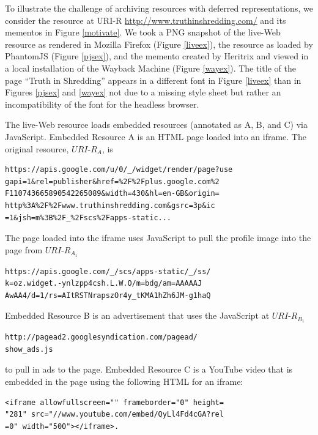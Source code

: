 \documentclass{ipres_proc_article-sp}
\begin{document}
To illustrate the challenge of archiving resources with deferred representations, we consider the resource at URI-R \url{http://www.truthinshredding.com/} and its mementos in Figure \ref{motivate}. We took a PNG snapshot of the live-Web resource as rendered in Mozilla Firefox (Figure \ref{liveex}), the resource as loaded by PhantomJS (Figure \ref{pjsex}), and the memento created by Heritrix and viewed in a local installation of the Wayback Machine (Figure \ref{wayex}). The title of the page ``Truth in Shredding'' appears in a different font in Figure \ref{liveex} than in Figures \ref{pjsex} and \ref{wayex} not due to a missing style sheet but rather an incompatibility of the font for the headless browser. %

The live-Web resource loads embedded resources (annotated as A, B, and C) via JavaScript. Embedded Resource A is an HTML page loaded into an iframe. The original resource, $URI$-$R_A$, is
\begin{verbatim}
https://apis.google.com/u/0/_/widget/render/page?use
gapi=1&rel=publisher&href=%2F%2Fplus.google.com%2
F110743665890542265089&width=430&hl=en-GB&origin=
http%3A%2F%2Fwww.truthinshredding.com&gsrc=3p&ic
=1&jsh=m%3B%2F_%2Fscs%2Fapps-static...
\end{verbatim}
\vskip -3mm
The page loaded into the iframe uses JavaScript to pull the profile image into the page from $URI$-$R_{A_1}$ 
\begin{verbatim}
https://apis.google.com/_/scs/apps-static/_/ss/
k=oz.widget.-ynlzpp4csh.L.W.O/m=bdg/am=AAAAAJ
AwAA4/d=1/rs=AItRSTNrapszOr4y_tKMA1hZh6JM-g1haQ
\end{verbatim}
Embedded Resource B is an advertisement that uses the JavaScript at $URI$-$R_{B_1}$ 
\begin{verbatim}
http://pagead2.googlesyndication.com/pagead/
show_ads.js
\end{verbatim}
to pull in ads to the page. Embedded Resource C is a YouTube video that is embedded in the page using the following HTML for an iframe:
 
\begin{verbatim}
<iframe allowfullscreen="" frameborder="0" height=
"281" src="//www.youtube.com/embed/QyLl4Fd4cGA?rel
=0" width="500"></iframe>.
\end{verbatim}
\end{document}
